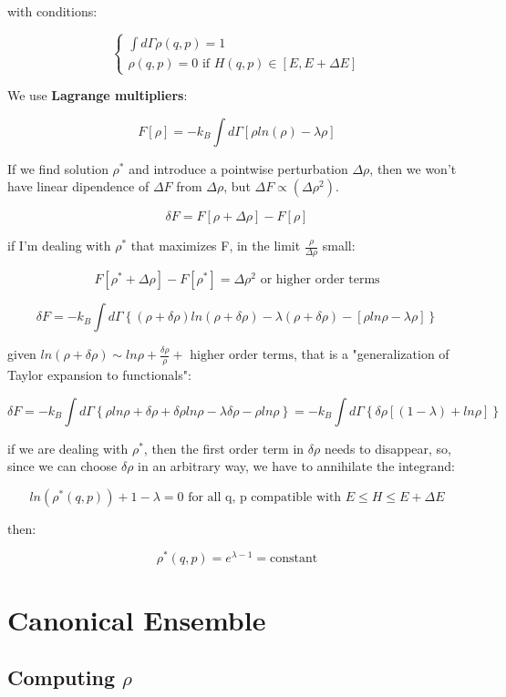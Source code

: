 \documentclass[a4paper, italian, openany]{book}
\begin{document}
with conditions:

$$\begin{cases}
\int d\Gamma \rho(q, p) = 1\\
\rho(q, p) = 0 \mbox{ if } H(q, p) \in \left [ E, E+\Delta E \right ]
\end{cases}
$$

We use \textbf{Lagrange multipliers}:

$$F\left [ \rho \right ] = -k_B \int d\Gamma \left [ \rho ln(\rho) -\lambda \rho \right ]$$

If we find solution $\rho^*$ and introduce a pointwise perturbation $\Delta \rho$, then we won't have linear dipendence of $\Delta F$ from $\Delta \rho$, but $\Delta F \propto (\Delta \rho^2)$.

$$\delta F = F[\rho +\Delta \rho] - F[\rho]$$ 

if I'm dealing with $\rho^*$ that maximizes F, in the limit $\frac{\rho}{\Delta\rho}$ small:

$$F[\rho^* +\Delta \rho] - F[\rho^*] = \Delta \rho^2 \mbox{ or higher order terms}$$ 

$$\delta F = -k_B \int d\Gamma \left \{ (\rho + \delta \rho)ln(\rho + \delta \rho) - \lambda (\rho +\delta \rho) - [\rho ln \rho -\lambda \rho] \right \}$$

given $ln(\rho + \delta \rho) \sim ln\rho + \frac{\delta \rho}{\rho} + \mbox{ higher order terms}$, that is a "generalization of Taylor expansion to functionals":

$$\delta F = - k_B \int d\Gamma \left \{ \rho ln\rho + \delta \rho + \delta \rho ln \rho - \lambda \delta \rho - \rho ln \rho \right \} = -k_B \int d\Gamma \left \{ \delta \rho [(1-\lambda) + ln \rho ] \right \}$$

if we are dealing with $\rho^*$, then the first order term in $\delta \rho$ needs to disappear, so, since we can choose $\delta \rho$ in an arbitrary way, we have to annihilate the integrand:

$$ln(\rho^*(q, p)) + 1-\lambda = 0 \mbox{ for all q, p compatible with } E \le H \le E+ \Delta E$$

then:

$$\rho^*(q, p) = e^{\lambda -1} = \mbox{constant}$$

\section{Canonical Ensemble}

\subsection{Computing $\rho$}
\end{document}
